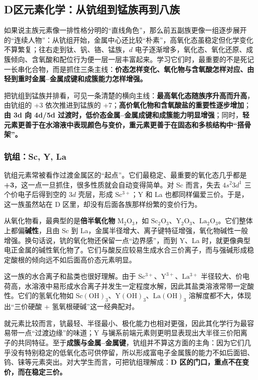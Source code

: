 \documentclass[UTF8]{ctexbook}
\begin{document}



\subsection{D区元素化学：从钪组到锰族再到八族}

如果说主族元素像一排性格分明的“直线角色”，那么前五副族更像一组逐步展开的“连续人物”：从钪组开始，金属中心还比较“朴素”，高氧化态虽稳定但化学变化不算繁复；往右走到钛、钒、铬、锰族，$d$ 电子逐渐增多，氧化态、氧化还原、成簇倾向、含氧酸和配位行为便一层一层丰富起来。学习它们时，最重要的不是死记一长串化合物，而是抓住三条主线：\textbf{价态怎样变化、氧化物与含氧酸怎样对应、由轻到重时金属--金属成键和成簇能力怎样增强。}


把钪组到锰族并排看，可见一条清楚的横向主线：\textbf{最高氧化态随族序升高而升高}，由钪组的 +3 依次推进到锰族的 +7；\textbf{高价氧化物和含氧酸盐的重要性逐步增加}；\textbf{由 3d 向 4d/5d 过渡时，低价态金属--金属成键和成簇能力明显增强}；同时，\textbf{轻元素更善于在水溶液中表现颜色与变价，重元素更善于在固态和多核结构中“搭骨架”。}

\subsubsection{钪组：Sc, Y, La}

钪组元素常被看作过渡金属区的“起点”。它们最稳定、最重要的氧化态几乎都是\textbf{+3}，这一点一旦抓住，很多性质就会自动变得简单。对 Sc 而言，失去 $4s^2 3d^1$ 三个价电子后得到空的 $3d$ 壳层，形成 $\mathrm{Sc^{3+}}$；Y 和 La 也都同样偏爱三价。于是，这一族虽然站在 D 区里，却没有后面各族那样纷繁的变价行为。

从氧化物看，最典型的是\textbf{倍半氧化物} $\mathrm{M_2O_3}$，如 $\mathrm{Sc_2O_3}$、$\mathrm{Y_2O_3}$、$\mathrm{La_2O_3}$。它们整体上都偏\textbf{碱性}，且由 Sc 到 La，金属半径增大、离子键特征增强，氧化物碱性一般增强。换句话说，钪的氧化物还保留一点“边界感”，而到 Y、La 时，就更像典型电正金属的碱性氧化物了。它们与酸反应较易生成水合三价离子，而与强碱形成稳定酸根的倾向远不如后面高价态元素明显。

这一族的水合离子和盐类也很好理解。由于 $\mathrm{Sc^{3+}}$、$\mathrm{Y^{3+}}$、$\mathrm{La^{3+}}$ 半径较大、价电荷高，水溶液中易形成水合离子并发生一定程度水解，因此其盐类溶液常带一定酸性。它们的氢氧化物如 $\mathrm{Sc(OH)_3}$、$\mathrm{Y(OH)_3}$、$\mathrm{La(OH)_3}$ 溶解度都不大，体现出“三价硬酸 + 氢氧根硬碱”这一经典配对。

就元素比较而言，钪最轻、半径最小、极化能力也相对更强，因此其化学行为最容易带一点“过渡边缘”的味道；Y 与镧系前端元素则更明显表现出大半径三价阳离子的共同特征。至于\textbf{成簇与金属--金属键}，钪组并不算这方面的主角：因为它们几乎没有特别稳定的低氧化态可供停留，所以形成富电子金属簇的能力不如后面钼、钨、铼等元素突出。对大学生而言，可把钪组理解成：\textbf{D 区的门口，重点不在变价，而在稳定三价。}
\end{document}
